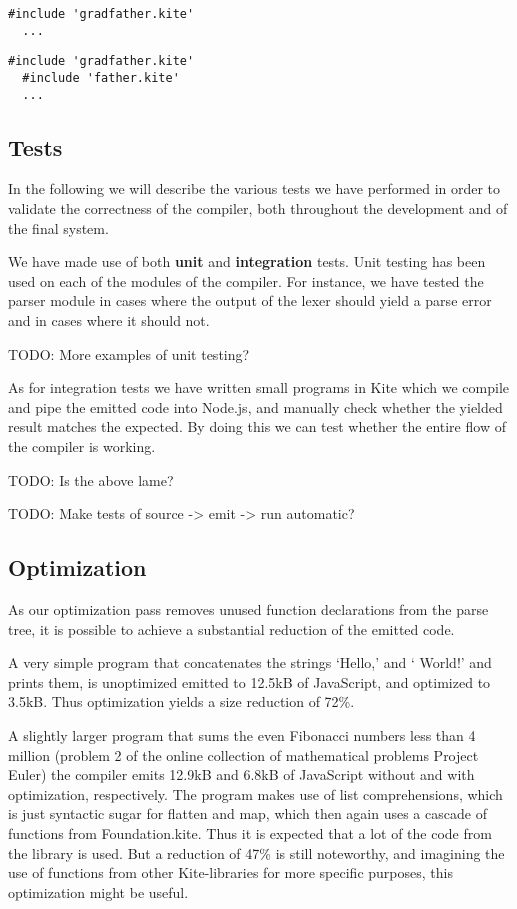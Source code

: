 \begin{lstlisting}[caption=\texttt{father.kite}]
  #include 'gradfather.kite'
  ...
\end{lstlisting}

\begin{lstlisting}[caption=\texttt{child.kite}]
  #include 'gradfather.kite'
  #include 'father.kite'
  ...
\end{lstlisting}


\subsection{Tests}

In the following we will describe the various tests we have performed in order to validate the correctness of the compiler, both throughout the development and of the final system.

We have made use of both \textbf{unit} and \textbf{integration} tests. Unit testing has been used on each of the modules of the compiler. For instance, we have tested the parser module in cases where the output of the lexer should yield a parse error and in cases where it should not.

TODO: More examples of unit testing?

As for integration tests we have written small programs in Kite which we compile and pipe the emitted code into Node.js, and manually check whether the yielded result matches the expected. By doing this we can test whether the entire flow of the compiler is working.

TODO: Is the above lame?

TODO: Make tests of  source -> emit -> run automatic?


\subsection{Optimization}
As our optimization pass removes unused function declarations from the parse tree, it is possible to achieve a substantial reduction of the emitted code.

A very simple program that concatenates the strings `Hello,' and ` World!' and prints them, is unoptimized emitted to 12.5kB of JavaScript, and optimized to 3.5kB. Thus optimization yields a size reduction of 72\%.

A slightly larger program that sums the even Fibonacci numbers less than 4 million (problem 2 of the online collection of mathematical problems Project Euler\cite{euler}) the compiler emits 12.9kB and 6.8kB of JavaScript without and with optimization, respectively. The program makes use of list comprehensions, which is just syntactic sugar for flatten and map, which then again uses a cascade of functions from Foundation.kite. Thus it is expected that a lot of the code from the library is used. But a reduction of 47\% is still noteworthy, and imagining the use of functions from other Kite-libraries for more specific purposes, this optimization might be useful.

